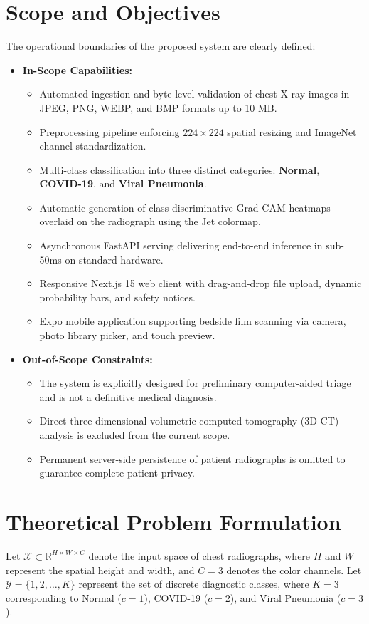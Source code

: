 \documentclass[12pt,a4paper]{report}
\begin{document}
\section{Scope and Objectives}
The operational boundaries of the proposed system are clearly defined:
\begin{itemize}
    \item \textbf{In-Scope Capabilities:}
    \begin{itemize}
        \item Automated ingestion and byte-level validation of chest X-ray images in JPEG, PNG, WEBP, and BMP formats up to 10 MB.
        \item Preprocessing pipeline enforcing $224 \times 224$ spatial resizing and ImageNet channel standardization.
        \item Multi-class classification into three distinct categories: \textbf{Normal}, \textbf{COVID-19}, and \textbf{Viral Pneumonia}.
        \item Automatic generation of class-discriminative Grad-CAM heatmaps overlaid on the radiograph using the Jet colormap.
        \item Asynchronous FastAPI serving delivering end-to-end inference in sub-50ms on standard hardware.
        \item Responsive Next.js 15 web client with drag-and-drop file upload, dynamic probability bars, and safety notices.
        \item Expo mobile application supporting bedside film scanning via camera, photo library picker, and touch preview.
    \end{itemize}
    \item \textbf{Out-of-Scope Constraints:}
    \begin{itemize}
        \item The system is explicitly designed for preliminary computer-aided triage and is not a definitive medical diagnosis.
        \item Direct three-dimensional volumetric computed tomography (3D CT) analysis is excluded from the current scope.
        \item Permanent server-side persistence of patient radiographs is omitted to guarantee complete patient privacy.
    \end{itemize}
\end{itemize}

\section{Theoretical Problem Formulation}
Let $\mathcal{X} \subset \mathbb{R}^{H \times W \times C}$ denote the input space of chest radiographs, where $H$ and $W$ represent the spatial height and width, and $C=3$ denotes the color channels. Let $\mathcal{Y} = \{1, 2, \dots, K\}$ represent the set of discrete diagnostic classes, where $K=3$ corresponding to Normal ($c=1$), COVID-19 ($c=2$), and Viral Pneumonia ($c=3$).
\end{document}
